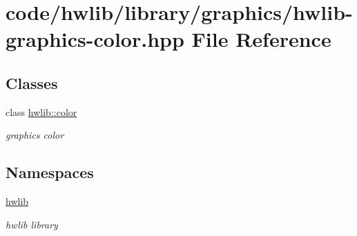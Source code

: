 \hypertarget{hwlib-graphics-color_8hpp}{}\section{code/hwlib/library/graphics/hwlib-\/graphics-\/color.hpp File Reference}
\label{hwlib-graphics-color_8hpp}
\subsection*{Classes}
\begin{DoxyCompactItemize}
\item 
class \hyperlink{classhwlib_1_1color}{hwlib\+::color}
\begin{DoxyCompactList}\small\item\em graphics color \end{DoxyCompactList}\end{DoxyCompactItemize}
\subsection*{Namespaces}
\begin{DoxyCompactItemize}
\item 
 \hyperlink{namespacehwlib}{hwlib}
\begin{DoxyCompactList}\small\item\em hwlib library \end{DoxyCompactList}\end{DoxyCompactItemize}
